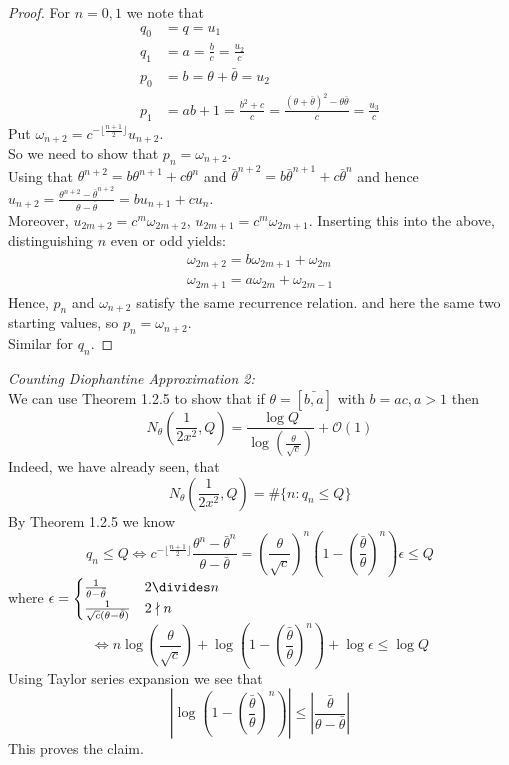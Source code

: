 \documentclass[NumTh.tex]{subfiles}
\begin{document}
\begin{proof}
  For $n = 0, 1$ we note that 
  \begin{align}
  q_0 &= q = u_1\\
  q_1 &= a = \frac{b}{c} = \frac{u_2}{c}\\
  p_0 &= b = \theta + \bar{\theta} = u_2\\
  p_1 &= a b + 1 = \frac{b^2+c}{c} = \frac{(\theta + \bar{\theta})^2 - \theta \bar{\theta}}{c} = \frac{u_3}{c}
 \end{align}
 Put $\omega_{n+2} = c^{-\lfloor\frac{n+1}{2} \rfloor} u_{n+2}$.\\
 So we need to show that $p_n = \omega_{n+2}$.\\
 Using that $\theta^{n+2} = b \theta^{n+1} + c \theta^n$ and $\bar{\theta}^{n+2} = b \bar{\theta}^{n+1} + c \bar{\theta}^n$
 and hence $u_{n+2} = \frac{\theta^{n+2} - \bar{\theta}^{n+2}}{\theta - \bar{\theta}} = b u_{n+1} + c u_n$.\\
 Moreover, $u_{2m+2} = c^m \omega_{2m+2}$, $u_{2m+1} = c^m \omega_{2m+1}$.
 Inserting this into the above, distinguishing $n$ even or odd yields:
 \begin{align}
   \omega_{2m+2} = b \omega_{2m+1} + \omega_{2m}\\
   \omega_{2m+1} = a \omega_{2m} + \omega_{2m - 1}
 \end{align}
 Hence, $p_n$ and $\omega_{n+2}$ satisfy the same recurrence relation. and here the same two starting values, so $p_n = \omega_{n+2}$.\\
 Similar for $q_n$.
\end{proof}

\emph{Counting Diophantine Approximation 2:}\\
We can use Theorem 1.2.5 to show that if $\theta = [\bar{b,a}]$ with $b = a c, a>1$ then 
\[ N_\theta(\frac{1}{2x^2},Q) = \frac{\log Q}{\log(\frac{\theta}{\sqrt{c}})} + \mathcal{O}(1)\]
Indeed, we have already seen, that 
\[ N_\theta(\frac{1}{2x^2},Q) = \#\{n: q_n \leq Q \} \]
By Theorem 1.2.5 we know
\[ q_n \leq Q \iff c^{-\lfloor\frac{n+1}{2} \rfloor} \frac{\theta^n - \bar{\theta}^n}{\theta - \bar{\theta}} = \left(\frac{\theta}{\sqrt{c}}\right)^n \left( 1 - \left(\frac{\bar{\theta}}{\theta}\right)^n\right) \epsilon \leq Q\]
where $ \epsilon = \begin{cases} \frac{1}{\theta - \bar{\theta}} & 2 \divides n\\ \frac{1}{\sqrt{c}(\theta -\bar{\theta})} & 2 \nmid n \end{cases}$
\[ \iff n \log\left(\frac{\theta}{\sqrt{c}}\right) + \log\left( 1 - \left(\frac{\bar{\theta}}{\theta}\right)^n\right) + \log \epsilon \leq \log Q \]
Using Taylor series expansion we see that 
\[ | \log\left( 1 - \left(\frac{\bar{\theta}}{\theta} \right)^n\right) | \leq | \frac{\bar{\theta}}{\theta - \bar{\theta}} |  \]
This proves the claim.
\end{document}
